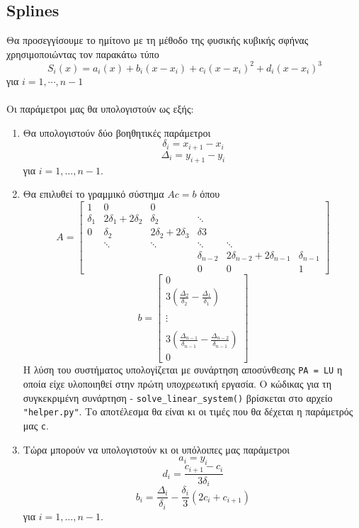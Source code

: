 \documentclass{article}
\begin{document}
\subsection{Splines}
Θα προσεγγίσουμε το ημίτονο με τη μέθοδο της φυσικής κυβικής σφήνας χρησιμοποιώντας τον παρακάτω τύπο
\[
S_i(x) = a_i(x) + b_i(x - x_i) + c_i(x - x_i)^2 + d_i(x - x_i)^3
\]
για \(i = 1, \cdots , n-1\)\\\\
Οι παράμετροι μας θα υπολογιστούν ως εξής:
\begin{enumerate}
    \item Θα υπολογιστούν δύο βοηθητικές παράμετροι
    \[
    δ_i = x_{i+1} - x_i
    \]
    \[
    Δ_i = y_{i+1} - y_i
    \]
    για \( i = 1, \ldots, n-1 \).\\
    \item Θα επιλυθεί το γραμμικό σύστημα \(Ac = b\) όπου
    \[
    A = \begin{bmatrix}
    1 & 0 & 0 \\
    δ_1 & 2δ_1 + 2δ_2 & δ_2 & \ddots \\
    0 & δ_2 & 2δ_2 + 2δ_3 & δ3 \\
      & \ddots & \ddots & \ddots & \ddots & \\
      & & & δ_{n-2} & 2δ_{n-2} + 2δ_{n-1} & δ_{n-1} \\
      & & & 0 & 0 & 1\
      
    \end{bmatrix}
    \]
    \[
    b = \begin{bmatrix}
        0 \\
        3(\frac{Δ_2}{δ_2} - \frac{Δ_1}{δ_1}) \\
        \\
        \vdots \\
        \\
        3(\frac{Δ_{n-1}}{δ_{n-1}} - \frac{Δ_{n-2}}{δ_{n-1}}) \\
        0 \        
    \end{bmatrix}
    \]
    Η λύση του συστήματος υπολογίζεται με συνάρτηση αποσύνθεσης \texttt{PA = LU} η οποία είχε υλοποιηθεί στην πρώτη υποχρεωτική εργασία. Ο κώδικας για τη συγκεκριμένη συνάρτηση - \texttt{solve\_linear\_system()} βρίσκεται στο αρχείο \texttt{"helper.py"}. Το αποτέλεσμα θα είναι κι οι τιμές που θα δέχεται η παράμετρός μας \texttt{c}.
    \item Τώρα μπορούν να υπολογιστούν κι οι υπόλοιπες μας παράμετροι
    \[
    a_i = y_i
    \]
    \[
    d_i = \frac{c_{i+1} - c_i}{3δ_i}
    \]
    \[
    b_i = \frac{Δ_i}{δ_i} - \frac{δ_i}{3} (2c_i + c_{i+1})
    \]
    για \( i = 1, \ldots, n-1 \).\\
\end{enumerate}
\end{document}
